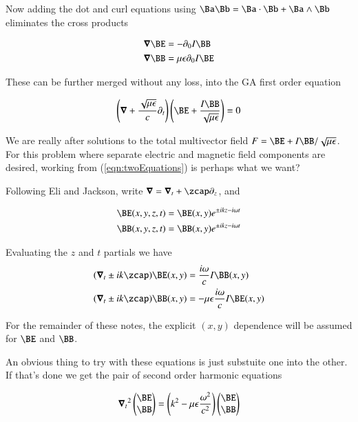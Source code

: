 Now adding the dot and curl equations using $\Ba \Bb = \Ba \cdot \Bb + \Ba \wedge \Bb$ eliminates the cross products

\begin{align}\label{eqn:twoEquations}
\spacegrad \BE &= - \partial_0 I \BB \\
\spacegrad \BB &= \mu \epsilon \partial_0 I \BE
\end{align}

These can be further merged without any loss, into the GA first order equation

\begin{align}\label{eqn:maxwell}
\left(\spacegrad + \frac{\sqrt{\mu\epsilon}}{c}\partial_t\right) \left(\BE + \frac{I\BB}{\sqrt{\mu\epsilon}} \right) = 0
\end{align}

We are really after solutions to the total multivector field $F = \BE + I \BB/\sqrt{\mu\epsilon}$.  For this problem where separate electric and magnetic field components are desired, working from (\ref{eqn:twoEquations}) is perhaps what we want?

Following Eli and Jackson, write $\spacegrad = \spacegrad_t + \zcap \partial_z$, and 

\begin{align}
\BE(x,y,z,t) &= \BE(x,y) e^{\pm i k z - i \omega t} \\
\BB(x,y,z,t) &= \BB(x,y) e^{\pm i k z - i \omega t}
\end{align}

Evaluating the $z$ and $t$ partials we have
\begin{align}
(\spacegrad_t \pm i k \zcap) \BE(x,y) &= \frac{i\omega}{c} I \BB(x,y) \\
(\spacegrad_t \pm i k \zcap) \BB(x,y) &= -\mu \epsilon \frac{i\omega}{c} I \BE(x,y)
\end{align}

For the remainder of these notes, the explicit $(x,y)$ dependence will be assumed for $\BE$ and $\BB$.

An obvious thing to try with these equations is just substuite one into the other.  If that's done we get the pair of second order harmonic equations

\begin{align}
{\spacegrad_t}^2
\begin{pmatrix}\BE \\ \BB \end{pmatrix}
= \left( k^2 - \mu \epsilon \frac{\omega^2}{c^2} \right)
\begin{pmatrix}\BE \\ \BB \end{pmatrix}
\end{align}

